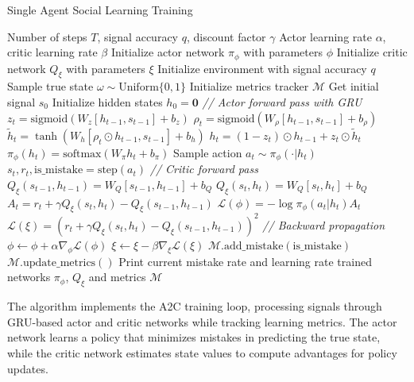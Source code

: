 \begin{algorithm}[H]
\caption{Single Agent Social Learning Training}
\label{alg:single-agent-training}
    \begin{algorithmic}[1]
    \Require Number of steps $T$, signal accuracy $q$, discount factor $\gamma$
    \Require Actor learning rate $\alpha$, critic learning rate $\beta$
    \State Initialize actor network $\pi_{\phi}$ with parameters $\phi$
    \State Initialize critic network $Q_{\xi}$ with parameters $\xi$
    \State Initialize environment with signal accuracy $q$
    \State Sample true state $\omega \sim \text{Uniform}\{0,1\}$
    \State Initialize metrics tracker $\mathcal{M}$
    \State Get initial signal $s_0$
    \State Initialize hidden states $h_0 = \mathbf{0}$
        \State \textit{// Actor forward pass with GRU}
        \State $z_t = \text{sigmoid}(W_z[h_{t-1}, s_{t-1}] + b_z)$
        \State $\rho_t = \text{sigmoid}(W_\rho[h_{t-1}, s_{t-1}] + b_\rho)$
        \State $\tilde{h}_t = \tanh(W_h[\rho_t \odot h_{t-1}, s_{t-1}] + b_h)$
        \State $h_t = (1-z_t) \odot h_{t-1} + z_t \odot \tilde{h}_t$
        \State $\pi_{\phi}(h_t) = \text{softmax}(W_{\pi}h_t + b_{\pi})$
        \State Sample action $a_t \sim \pi_{\phi}(\cdot|h_t)$
        \State $s_t, r_t, \text{is\_mistake} = \text{step}(a_t)$ 
        \State \textit{// Critic forward pass}
        \State $Q_{\xi}(s_{t-1}, h_{t-1}) = W_Q[s_{t-1}, h_{t-1}] + b_Q$
        \State $Q_{\xi}(s_t, h_t) = W_Q[s_t, h_t] + b_Q$
        \State $A_t = r_t + \gamma Q_{\xi}(s_t, h_t) - Q_{\xi}(s_{t-1}, h_{t-1})$
        \State $\mathcal{L}(\phi) = -\log \pi_{\phi}(a_t|h_t) A_t$ 
        \State $\mathcal{L}(\xi) = (r_t + \gamma Q_{\xi}(s_t, h_t) - Q_{\xi}(s_{t-1}, h_{t-1}))^2$ 
        \State \textit{// Backward propagation}
        \State $\phi \leftarrow \phi + \alpha \nabla_{\phi} \mathcal{L}(\phi)$ 
        \State $\xi \leftarrow \xi - \beta \nabla_{\xi} \mathcal{L}(\xi)$ 
        \State $\mathcal{M}.\text{add\_mistake}(\text{is\_mistake})$
        \State $\mathcal{M}.\text{update\_metrics}()$
            \State Print current mistake rate and learning rate
        \EndIf
    \EndFor
    \State \Return trained networks $\pi_{\phi}$, $Q_{\xi}$ and metrics $\mathcal{M}$
    \end{algorithmic}
\end{algorithm}

The algorithm implements the A2C training loop, processing signals through GRU-based actor and critic networks while tracking learning metrics. The actor network learns a policy that minimizes mistakes in predicting the true state, while the critic network estimates state values to compute advantages for policy updates.



